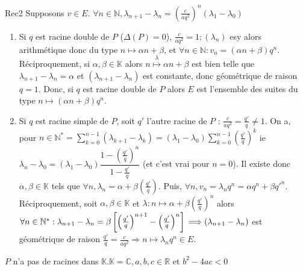 \documentclass[12pt,a4paper]{report}
\begin{document}
\begin{demonstration}{Rec2}
Supposons $v \in E$. $\forall n \in \mathbb{N}, \lambda_{n+1}-\lambda_n = \left(\frac{c}{aq^2}\right)^n(\lambda_1-\lambda_0)$
\begin{enumerate}
\item Si $q$ est racine double de $P$ ($\Delta(P)=0$), $\frac{c}{aq^2}=1 ; (\lambda_n)$ esy alors arithmétique donc du type $n \mapsto \alpha n + \beta$, et $\forall n \in \mathbb{N} : v_n = (\alpha n + \beta)q^n$.
\newline Réciproquement, si $\alpha,\beta \in \mathbb{K}$ alors $n\overset{\lambda}{\mapsto} \alpha n +\beta$ est bien telle que $\lambda_{n+1}-\lambda_n = \alpha$ et $(\lambda_{n+1}-\lambda_n)$ est constante, donc géométrique de raison $q=1$.
\newline Donc, si $q$ est racine double de $P$ alors $E$ est l'ensemble des suites du type $n \mapsto (\alpha n + \beta) q^n$.
\item Si $q$ est racine simple de $P$, soit $q'$ l'autre racine de $P$ : $\frac{c}{aq^2}= \frac{q'}{q} \neq 1$.
\newline On a, pour $n \in \mathbb{N}^* = \sum_{k=0}^{n-1} (\lambda_{k+1}-\lambda_k) = (\lambda_1-\lambda_0)\sum_{k=0}^{n-1}\left(\frac{q'}{q}\right)^k$
\newline \newline ie $\lambda_n - \lambda_0 = (\lambda_1-\lambda_0) \dfrac{1-\left(\frac{q'}{q}\right)^n}{1-\frac{q'}{q}}$ (et c'est vrai pour $n=0$).
\newline Il existe donc $\alpha,\beta \in \mathbb{K}$ tels que $\forall n, \lambda_n = \alpha + \beta\left(\frac{q'}{q}\right)$.
\newline Puis, $\forall n, v_n = \lambda_n q^n = \alpha q^n + \beta q'^n$.
\newline Réciproquement, soit $\alpha, \beta \in \mathbb{K}$ et $\lambda : n \mapsto \alpha + \beta\left(\frac{q'}{q}\right)^n$ alors $\forall n \in \mathbb{N}^* : \lambda_{n+1}-\lambda_n = \beta\left[\left(\frac{q'}{q}\right)^{n+1}-\left(\frac{q'}{q}\right)^n\right]
\newline \Longrightarrow (\lambda_{n+1}-\lambda_n)$ est géométrique de raison $\frac{q'}{q} = \frac{c}{aq^2} \Longrightarrow n \mapsto \lambda_nq^n \in E$.
\end{enumerate}
\par {} $P$ n'a pas de racines dans $\mathbb{K}. \mathbb{K} = \mathbb{C}, a,b,c \in \mathbb{R}$ et $b^2-4ac < 0$ 

\end{demonstration}
\end{document}
